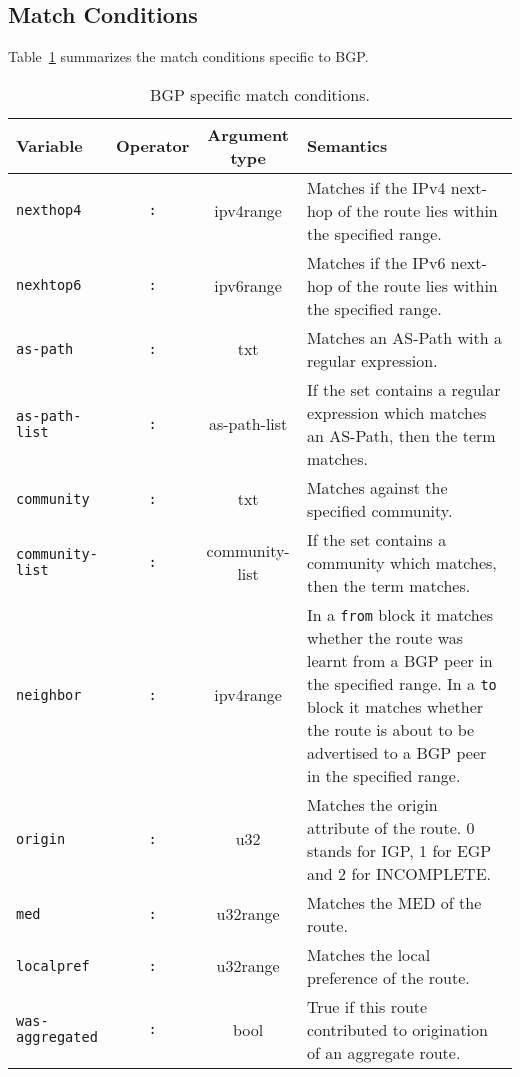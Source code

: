 \subsection{Match Conditions}
Table~\ref{policy_bgp_match} summarizes the match conditions specific to BGP.
\begin{table}[h]
\centering
\begin{tabular}{|l|c|c|p{7cm}|}
\hline
Variable & Operator & Argument type & Semantics \\
\hline\hline
{\tt nexthop4} & {\tt :} & ipv4range & Matches if the IPv4 next-hop of the route
lies within the specified range.\\
{\tt nexhtop6} & {\tt :} & ipv6range & Matches if the IPv6 next-hop of the route
lies within the specified range. \\
\hline
{\tt as-path} & {\tt :} & txt & Matches an AS-Path with a regular expression. \\
{\tt as-path-list} & {\tt :} & as-path-list & If the set contains a regular
expression which matches an AS-Path, then the term matches. \\
\hline
{\tt community} & {\tt :} & txt & Matches against the specified community. \\
{\tt community-list} & {\tt :} & community-list & If the set contains a
community which matches, then the term matches. \\
\hline
{\tt neighbor} & {\tt :} & ipv4range & In a {\tt from} block it matches whether
the route was learnt from a BGP peer in the specified range.  In a {\tt to}
block it matches whether the route is about to be advertised to a BGP peer in
the specified range. \\
\hline
{\tt origin} & {\tt :} & u32 & Matches the origin attribute of the route. 0
stands for IGP, 1 for EGP and 2 for INCOMPLETE.  \\
\hline
{\tt med} & {\tt :} & u32range & Matches the MED of the route. \\
\hline
{\tt localpref} & {\tt :} & u32range & Matches the local preference of the route. \\
\hline
{\tt was-aggregated} & {\tt :} & bool & True if this route contributed to
origination of an aggregate route. \\
\hline
\end{tabular}
\caption{\label{policy_bgp_match}BGP specific match conditions.}
\end{table}

